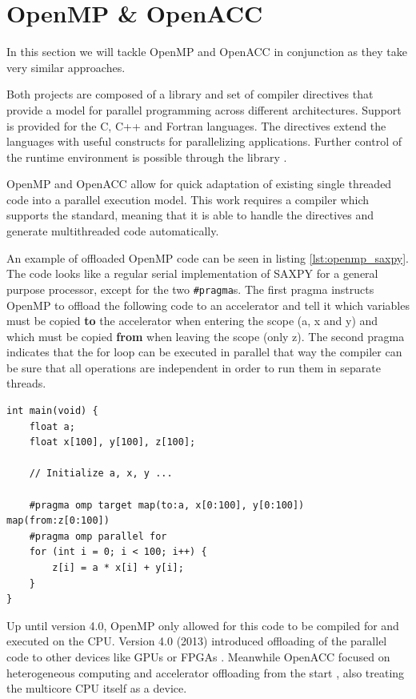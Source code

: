 \section{OpenMP \& OpenACC}
In this section we will tackle OpenMP and OpenACC in conjunction as they take very similar approaches.

Both projects are composed of a library and set of compiler directives that provide a model for parallel programming across different architectures. Support is provided for the C, C++ and Fortran languages. The directives extend the languages with useful constructs for parallelizing applications. Further control of the runtime environment is possible through the library \cite{openmp_spec, openacc_spec}.

OpenMP and OpenACC allow for quick adaptation of existing single threaded code into a parallel execution model. This work requires a compiler which supports the standard, meaning that it is able to handle the directives and generate multithreaded code automatically.

An example of offloaded OpenMP code can be seen in listing \ref{lst:openmp_saxpy}. The code looks like a regular serial implementation of SAXPY for a general purpose processor, except for the two \texttt{\#pragma}s. The first pragma instructs OpenMP to offload the following code to an accelerator and tell it which variables must be copied \textbf{to} the accelerator when entering the scope (a, x and y) and which must be copied \textbf{from} when leaving the scope (only z). The second pragma indicates that the for loop can be executed in parallel that way the compiler can be sure that all operations are independent in order to run them in separate threads.

\begin{lstlisting}[style=CStyle, caption=OpenMP saxpy example, float, floatplacement=H, label={lst:openmp_saxpy}]
int main(void) {
    float a;
    float x[100], y[100], z[100];

    // Initialize a, x, y ...

    #pragma omp target map(to:a, x[0:100], y[0:100]) map(from:z[0:100])
    #pragma omp parallel for
    for (int i = 0; i < 100; i++) {
        z[i] = a * x[i] + y[i];
    }
}
\end{lstlisting}

Up until version 4.0, OpenMP only allowed for this code to be compiled for and executed on the CPU. Version 4.0 (2013) introduced offloading of the parallel code to other devices like GPUs or FPGAs \cite{openmp_gpu_support}. Meanwhile OpenACC focused on heterogeneous computing and accelerator offloading from the start \cite{openacc_initial_spec}, also treating the multicore CPU itself as a device.

